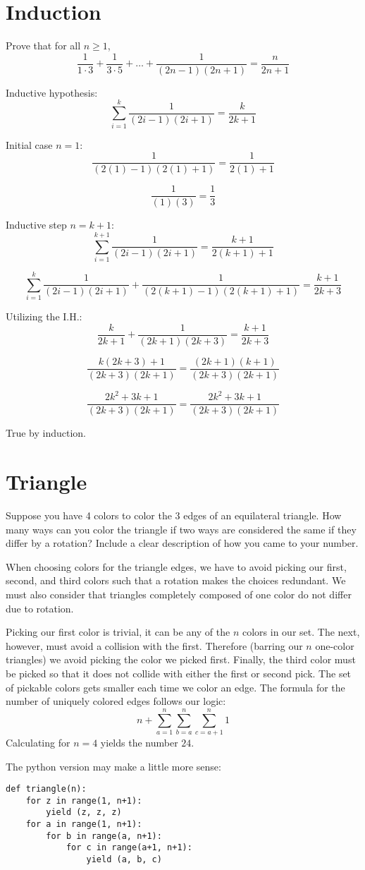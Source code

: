 \documentclass{article}
\begin{document}
\section{Induction}
Prove that for all $n \geq 1$,
\[
    \frac{1}{1 \cdot 3} +
    \frac{1}{3 \cdot 5} +
    \ldots +
    \frac{1}{(2n - 1)(2n + 1)} =
    \frac{n}{2n + 1}
\]

\noindent Inductive hypothesis:
\[
    \sum^k_{i = 1} \frac{1}{(2i - 1)(2i + 1)} =
    \frac{k}{2k + 1}
\]

\noindent Initial case $n = 1$:
\[
    \frac{1}{(2(1) - 1)(2(1) + 1)} =
    \frac{1}{2(1)+1}
\]

\[
    \frac{1}{(1)(3)} =
    \frac{1}{3}
\]

\medskip

\noindent Inductive step $n = k + 1$:
\[
    \sum^{k+1}_{i = 1} \frac{1}{(2i - 1)(2i + 1)} =
    \frac{k+1}{2(k + 1) + 1}
\]

\[
    \sum^{k}_{i = 1} \frac{1}{(2i - 1)(2i + 1)} +
    \frac{1}{(2(k + 1) - 1)(2(k + 1) + 1)} =
    \frac{k + 1}{2k + 3}
\]

\noindent Utilizing the I.H.:
\[
    \frac{k}{2k + 1} +
    \frac{1}{(2k + 1)(2k + 3)} =
    \frac{k + 1}{2k + 3}
\]

\[
    \frac{k(2k + 3) + 1}{(2k + 3)(2k + 1)} =
    \frac{(2k + 1)(k + 1)}{(2k + 3)(2k + 1)}
\]

\[
    \frac{2k^2 + 3k + 1}{(2k + 3)(2k + 1)} =
    \frac{2k^2 + 3k + 1}{(2k + 3)(2k + 1)}
\]

True by induction.

\section{Triangle}
Suppose you have 4 colors to color the 3 edges of an equilateral triangle. How many ways can you color the triangle if two ways are considered the same if they differ by a rotation? Include a clear description of how you came to your number.

\bigskip

When choosing colors for the triangle edges, we have to avoid picking our first, second, and third colors such that a rotation makes the choices redundant. We must also consider that triangles completely composed of one color do not differ due to rotation.

Picking our first color is trivial, it can be any of the $n$ colors in our set. The next, however, must avoid a collision with the first. Therefore (barring our $n$ one-color triangles) we avoid picking the color we picked first. Finally, the third color must be picked so that it does not collide with either the first or second pick. The set of pickable colors gets smaller each time we color an edge. The formula for the number of uniquely colored edges follows our logic:
\[
    n + \sum^n_{a = 1} \sum^n_{b = a} \sum^n_{c = a + 1} 1
\]
Calculating for $n = 4$ yields the number $24$. 

\bigskip 
\noindent The python version may make a little more sense:
\begin{verbatim}
def triangle(n):
    for z in range(1, n+1):
        yield (z, z, z)
    for a in range(1, n+1):
        for b in range(a, n+1):
            for c in range(a+1, n+1):
                yield (a, b, c)
\end{verbatim}
\end{document}
